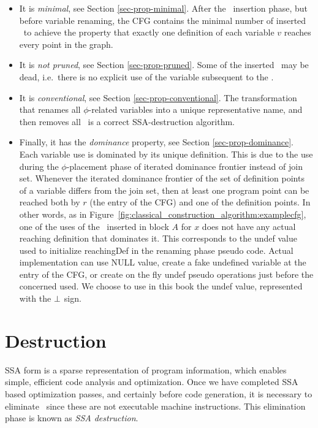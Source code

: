 \begin{itemize}
\item It is \textit{minimal}, see Section \ref{sec-prop-minimal}.
After the \phiop\ insertion phase,
but before variable renaming, the CFG contains the minimal 
number of inserted \phiops\ to achieve the property that exactly
one definition of each variable $v$ reaches every point in the graph.
\item It is \textit{not pruned}, see Section \ref{sec-prop-pruned}.
Some of the inserted \phiops\
may be dead, i.e.\ there is no explicit use of the variable subsequent
to the \phiop.
\item It is \textit{conventional}, see Section \ref{sec-prop-conventional}.
The transformation that renames all $\phi$-related variables into a
unique representative name, and then removes all \phiops\ is a correct SSA-destruction algorithm.
\item Finally, it has the \textit{dominance} property, see Section
\ref{sec-prop-dominance}.
Each variable use is dominated by its unique definition. This is due to the use during the $\phi$-placement phase of iterated dominance frontier instead of join set. Whenever the iterated dominance frontier of the set of definition points of a variable differs from the join set, then at least one program point can be reached both by $r$ (the entry of the CFG) and one of the definition points. In other words, as in Figure~\ref{fig:classical_construction_algorithm:examplecfg}, one of the uses of the \phiop\ inserted in block $A$ for $x$ does not have any actual reaching definition that dominates it. This corresponds to the undef value used to initialize reachingDef in the renaming phase pseudo code. Actual implementation can use NULL value, create a fake undefined variable at the entry of the CFG, or create on the fly undef pseudo operations just before the concerned used. We choose to use in this book the undef value, represented with the $\perp$ sign.
\end{itemize}


\section{Destruction}
\label{sec:classical_construction_algorithm:destruction}

SSA form is a 
sparse representation of program information,
which enables simple, efficient code analysis and optimization.
Once we have completed SSA based optimization passes,
and certainly before code generation,
it is necessary to eliminate \phiops\ since these
are not executable machine instructions.
This elimination phase is known as \textit{SSA destruction}. 

